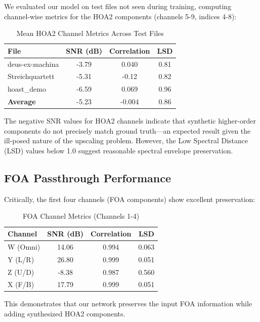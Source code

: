 \documentclass[10pt,twocolumn]{article}
\begin{document}
We evaluated our model on test files not seen during training, computing channel-wise metrics for the HOA2 components (channels 5-9, indices 4-8):

\begin{table}[H]
\centering
\caption{Mean HOA2 Channel Metrics Across Test Files}
\begin{tabular}{@{}lccc@{}}
\toprule
\textbf{File} & \textbf{SNR (dB)} & \textbf{Correlation} & \textbf{LSD} \\
\midrule
deus-ex-machina & -3.79 & 0.040 & 0.81 \\
Streichquartett & -5.31 & -0.12 & 0.82 \\
hoast\_demo & -6.59 & 0.069 & 0.96 \\
\midrule
\textbf{Average} & -5.23 & -0.004 & 0.86 \\
\bottomrule
\end{tabular}
\label{tab:metrics}
\end{table}

The negative SNR values for HOA2 channels indicate that synthetic higher-order components do not precisely match ground truth---an expected result given the ill-posed nature of the upscaling problem. However, the Low Spectral Distance (LSD) values below 1.0 suggest reasonable spectral envelope preservation.

\subsection{FOA Passthrough Performance}

Critically, the first four channels (FOA components) show excellent preservation:

\begin{table}[H]
\centering
\caption{FOA Channel Metrics (Channels 1-4)}
\begin{tabular}{@{}lccc@{}}
\toprule
\textbf{Channel} & \textbf{SNR (dB)} & \textbf{Correlation} & \textbf{LSD} \\
\midrule
W (Omni) & 14.06 & 0.994 & 0.063 \\
Y (L/R) & 26.80 & 0.999 & 0.051 \\
Z (U/D) & -8.38 & 0.987 & 0.560 \\
X (F/B) & 17.79 & 0.999 & 0.051 \\
\bottomrule
\end{tabular}
\label{tab:foa}
\end{table}

This demonstrates that our network preserves the input FOA information while adding synthesized HOA2 components.
\end{document}
